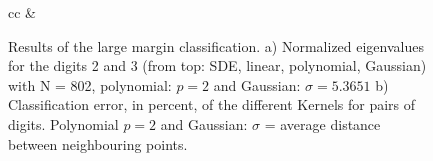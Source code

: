 \documentclass[a4paper,12pt]{article}
\begin{document}
\begin{figure}
\centering
\begin{tabular}{cc}
\label{fig:Class} & 
\end{tabular}
\caption{Results of the large margin classification. a) Normalized eigenvalues for the digits 2 and 3 (from top: SDE, linear, polynomial, Gaussian) with N = 802, polynomial: $p=2$ and Gaussian: $\sigma = 5.3651$ b) Classification error, in percent, of the different Kernels for pairs of digits. Polynomial $p=2$ and Gaussian: $\sigma$ = average distance between neighbouring points. }\label{fig:Class}
\end{figure}

\end{document}
